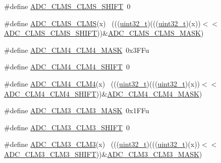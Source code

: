 \begin{DoxyCompactItemize}
\item 
\#define \hyperlink{group___a_d_c___register___masks_gabe0e92adb89c86d0523958a947288808}{A\+D\+C\+\_\+\+C\+L\+M\+S\+\_\+\+C\+L\+M\+S\+\_\+\+S\+H\+I\+FT}~0
\item 
\#define \hyperlink{group___a_d_c___register___masks_ga08f7411075a5d5ba22c96f5f9027f580}{A\+D\+C\+\_\+\+C\+L\+M\+S\+\_\+\+C\+L\+MS}(x)                                              ~(((\hyperlink{_p_e___types_8h_a33594304e786b158f3fb30289278f5af}{uint32\+\_\+t})(((\hyperlink{_p_e___types_8h_a33594304e786b158f3fb30289278f5af}{uint32\+\_\+t})(x))$<$$<$\hyperlink{group___a_d_c___register___masks_gabe0e92adb89c86d0523958a947288808}{A\+D\+C\+\_\+\+C\+L\+M\+S\+\_\+\+C\+L\+M\+S\+\_\+\+S\+H\+I\+FT}))\&\hyperlink{group___a_d_c___register___masks_ga108adc09b24001dddfd498e14213fea6}{A\+D\+C\+\_\+\+C\+L\+M\+S\+\_\+\+C\+L\+M\+S\+\_\+\+M\+A\+SK})
\item 
\#define \hyperlink{group___a_d_c___register___masks_ga9f8f5b63268c5b87f04ee884579a385b}{A\+D\+C\+\_\+\+C\+L\+M4\+\_\+\+C\+L\+M4\+\_\+\+M\+A\+SK}~0x3\+F\+Fu
\item 
\#define \hyperlink{group___a_d_c___register___masks_gafa9121fc54ce9386fdc4c1d05f45d0de}{A\+D\+C\+\_\+\+C\+L\+M4\+\_\+\+C\+L\+M4\+\_\+\+S\+H\+I\+FT}~0
\item 
\#define \hyperlink{group___a_d_c___register___masks_ga8fe6607d44a572792ff6df0b119716ae}{A\+D\+C\+\_\+\+C\+L\+M4\+\_\+\+C\+L\+M4}(x)                                              ~(((\hyperlink{_p_e___types_8h_a33594304e786b158f3fb30289278f5af}{uint32\+\_\+t})(((\hyperlink{_p_e___types_8h_a33594304e786b158f3fb30289278f5af}{uint32\+\_\+t})(x))$<$$<$\hyperlink{group___a_d_c___register___masks_gafa9121fc54ce9386fdc4c1d05f45d0de}{A\+D\+C\+\_\+\+C\+L\+M4\+\_\+\+C\+L\+M4\+\_\+\+S\+H\+I\+FT}))\&\hyperlink{group___a_d_c___register___masks_ga9f8f5b63268c5b87f04ee884579a385b}{A\+D\+C\+\_\+\+C\+L\+M4\+\_\+\+C\+L\+M4\+\_\+\+M\+A\+SK})
\item 
\#define \hyperlink{group___a_d_c___register___masks_ga546b5a27d980deed324add231c050a6f}{A\+D\+C\+\_\+\+C\+L\+M3\+\_\+\+C\+L\+M3\+\_\+\+M\+A\+SK}~0x1\+F\+Fu
\item 
\#define \hyperlink{group___a_d_c___register___masks_ga9bdd0a97bea9576ea5c9eccd54c08940}{A\+D\+C\+\_\+\+C\+L\+M3\+\_\+\+C\+L\+M3\+\_\+\+S\+H\+I\+FT}~0
\item 
\#define \hyperlink{group___a_d_c___register___masks_ga804fa8f0631204819dad8ccb2e32acea}{A\+D\+C\+\_\+\+C\+L\+M3\+\_\+\+C\+L\+M3}(x)                                              ~(((\hyperlink{_p_e___types_8h_a33594304e786b158f3fb30289278f5af}{uint32\+\_\+t})(((\hyperlink{_p_e___types_8h_a33594304e786b158f3fb30289278f5af}{uint32\+\_\+t})(x))$<$$<$\hyperlink{group___a_d_c___register___masks_ga9bdd0a97bea9576ea5c9eccd54c08940}{A\+D\+C\+\_\+\+C\+L\+M3\+\_\+\+C\+L\+M3\+\_\+\+S\+H\+I\+FT}))\&\hyperlink{group___a_d_c___register___masks_ga546b5a27d980deed324add231c050a6f}{A\+D\+C\+\_\+\+C\+L\+M3\+\_\+\+C\+L\+M3\+\_\+\+M\+A\+SK})
$$
\end{DoxyCompactItemize}
